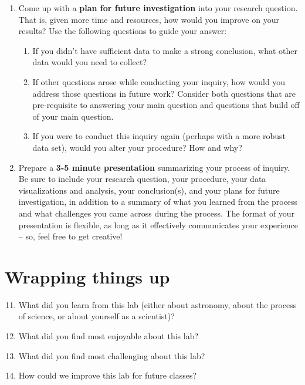 \documentclass[11pt]{article}%
\begin{document}
\begin{enumerate}
    \item Come up with a \textbf{plan for future investigation} into your research question. That is, given more time and resources, how would you improve on your results? Use the following questions to guide your answer:
    \begin{enumerate}
        \item If you didn’t have sufficient data to make a strong conclusion, what other data would you need to collect?
        \item If other questions arose while conducting your inquiry, how would you address those questions in future work? Consider both questions that are pre-requisite to answering your main question and questions that build off of your main question.
        \item If you were to conduct this inquiry again (perhaps with a more robust data set), would you alter your procedure? How and why?
    \end{enumerate}

    \item Prepare a \textbf{3-5 minute presentation} summarizing your process of inquiry. Be sure to include your research question, your procedure, your data visualizations and analysis, your conclusion(s), and your plans for future investigation, in addition to a summary of what you learned from the process and what challenges you came across during the process. The format of your presentation is flexible, as long as it effectively communicates your experience -- so, feel free to get creative!
\end{enumerate}


\section{Wrapping things up}
\begin{enumerate}
\setcounter{enumi}{10}

\item What did you learn from this lab (either about astronomy, about the process of science, or about yourself as a scientist)?

\item What did you find most enjoyable about this lab?

\item What did you find most challenging about this lab?

\item How could we improve this lab for future classes?
 
\end{enumerate}
\end{document}
